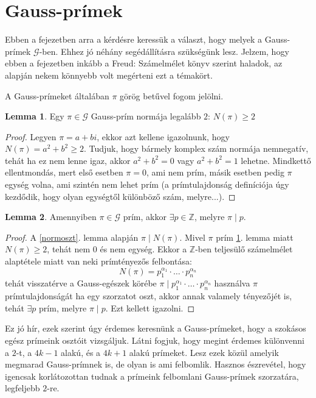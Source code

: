 \documentclass[12pt]{book}
\theoremstyle{plain} %
\theoremstyle{definition} %
\newtheorem{lem/}{Lemma}[section]
\newenvironment{lem}
  {\renewcommand{\qedsymbol}{$\clubsuit$}%
   \pushQED{\qed}\begin{lem/}}
  {\popQED\end{lem/}}
\theoremstyle{remark}
\renewcommand\qedsymbol{$\blacksquare$}
\numberwithin{equation}{section}  %
\def\Z{\mathbb{Z}}
\def\G{\mathcal{G}}
\begin{document}
	\section{Gauss-prímek}

	Ebben a fejezetben arra a kérdésre keressük a választ, hogy melyek a Gauss-prímek $\G$-ben. Ehhez jó néhány segédállításra szükségünk lesz. Jelzem, hogy ebben a fejezetben inkább a Freud: Számelmélet könyv szerint haladok, az alapján nekem könnyebb volt megérteni ezt a témakört.

	A Gauss-prímeket általában $\pi$ görög betűvel fogom jelölni.

	\begin{lem}\label{prnorm}
		Egy $\pi\in \G$ Gauss-prím normája legalább $2$: $N(\pi)\geq 2$
	\end{lem}

	\begin{proof}
		Legyen $\pi = a + bi$, ekkor azt kellene igazolnunk, hogy $N(\pi)=a^2+b^2\geq 2$. Tudjuk, hogy bármely komplex szám normája nemnegatív, tehát ha ez nem lenne igaz, akkor $a^2+b^2 = 0$ vagy $a^2+b^2=1$ lehetne. Mindkettő ellentmondás, mert első esetben $\pi = 0$, ami nem prím, másik esetben pedig $\pi$ egység volna, ami szintén nem lehet prím (a prímtulajdonság definíciója úgy kezdődik, hogy olyan egységtől különböző szám, melyre...).
	\end{proof}

	
	\begin{lem}\label{gpl1}
		Amennyiben $\pi\in \G$ prím, akkor $\exists p\in \Z$, melyre $\pi \mid p$.
	\end{lem}

	\begin{proof}
		A \ref{normoszt}. lemma alapján $\pi \mid N(\pi)$. Mivel $\pi$ prím \ref{prnorm}. lemma miatt $N(\pi)\geq 2$, tehát nem $0$ és nem egység. Ekkor a $\Z$-ben teljesülő számelmélet alaptétele miatt van neki prímtényezős felbontása:
		\[ N(\pi) = p_1^{\alpha_1} \cdot \ldots \cdot p_n^{\alpha_n}  \]
		tehát visszatérve a Gauss-egészek körébe $\pi \mid p_1^{\alpha_1} \cdot \ldots \cdot p_n^{\alpha_n} $
		használva $\pi$ prímtulajdonságát ha egy szorzatot oszt, akkor annak valamely tényezőjét is, tehát $\exists p$ prím, melyre $\pi \mid p$. Ezt kellett igazolni.
	\end{proof}
	
	Ez jó hír, ezek szerint úgy érdemes keresnünk a Gauss-prímeket, hogy a szokásos egész prímeink osztóit vizsgáljuk. Látni fogjuk, hogy megint érdemes különvenni a $2$-t, a $4k-1$ alakú, és a $4k+1$ alakú prímeket. Lesz ezek közül amelyik megmarad Gauss-prímnek is, de olyan is ami felbomlik. Hasznos észrevétel, hogy igencsak korlátozottan tudnak a prímeink felbomlani Gauss-prímek szorzatára, legfeljebb $2$-re.
	
\end{document}
